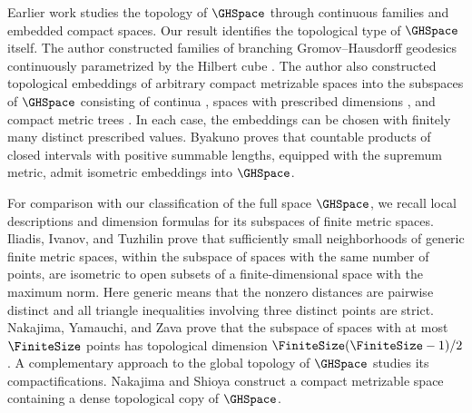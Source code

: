 Earlier work studies the topology of
$\GHSpace$
through continuous families and embedded compact spaces.
Our result identifies the topological type of
$\GHSpace$
itself.
The author constructed families of branching Gromov--Hausdorff geodesics
continuously parametrized by the Hilbert cube
\cite[Theorem~1.3]{Ishiki2022Branching}.
The author also constructed topological embeddings of arbitrary compact metrizable
spaces into the subspaces of
$\GHSpace$
consisting of continua
\cite[Theorem~1.1]{Ishiki2022Continua},
spaces with prescribed dimensions
\cite[Theorem~1.3]{Ishiki2023FractalDimensions},
and compact metric trees
\cite[Theorem~1.1]{Ishiki2023MetricTrees}.
In each case,
the embeddings can be chosen with finitely many distinct prescribed values.
Byakuno
\cite[arXiv v1, Corollary~1.4]{Byakuno2026Embedding}
proves that countable products of closed intervals with positive summable lengths,
equipped with the supremum metric,
admit isometric embeddings into
$\GHSpace$.

For comparison with our classification of the full space
$\GHSpace$,
we recall local descriptions and dimension formulas for its subspaces
of finite metric spaces.
Iliadis,
Ivanov,
and Tuzhilin
\cite[arXiv v1, Theorem~4.1]{IliadisIvanovTuzhilin2017Local}
prove that sufficiently small neighborhoods of generic finite metric spaces,
within the subspace of spaces with the same number of points,
are isometric to open subsets of a finite-dimensional space with the maximum norm.
Here generic means that the nonzero distances are pairwise distinct
and all triangle inequalities involving three distinct points are strict.
Nakajima,
Yamauchi,
and Zava
\cite[arXiv v1, Theorem~A]{NakajimaYamauchiZava2025}
prove that the subspace of spaces with at most
$\FiniteSize$
points has topological dimension
$\FiniteSize(\FiniteSize-1)/2$.
A complementary approach to the global topology of
$\GHSpace$
studies its compactifications.
Nakajima and Shioya
\cite[arXiv v1, Main Theorem~1.2]{NakajimaShioyaCompactification}
construct a compact metrizable space containing a dense topological copy of
$\GHSpace$.

